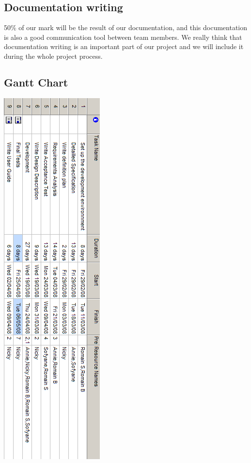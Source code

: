 \documentclass[a4paper,12pt]{article}
\begin{document}
\subsection{Documentation writing}
50\% of our mark will be the result of our documentation, and this documentation is also a good communication tool between team members.
We really think that documentation writing is an important part of our project and we will include it during the whole project process.
\newpage
\subsection{Gantt Chart}
\begin{center}
\includegraphics[scale=0.7]{ressources.png}
\end{center}
\newpage
\end{document}
